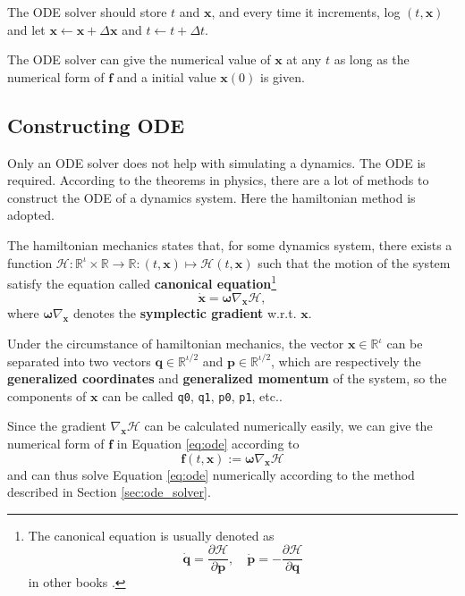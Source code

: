 \documentclass[12pt]{article}
\begin{document}
The ODE solver should store $t$ and $\mathbf x$,
and every time it increments, log $\left(t,\mathbf x\right)$ and
let $\mathbf x\leftarrow\mathbf x+\Delta\mathbf x$ and $t\leftarrow t+\Delta t$.

The ODE solver can give the numerical value of $\mathbf x$ at any $t$
as long as the numerical form of $\mathbf f$
and a initial value $\mathbf x\left(0\right)$
is given.

\subsection{Constructing ODE}

Only an ODE solver does not help with simulating a dynamics.
The ODE is required.
According to the theorems in physics,
there are a lot of methods to construct the ODE of a dynamics system.
Here the hamiltonian method is adopted.

The hamiltonian mechanics states that, for some dynamics system,
there exists a function
$\mathcal H:\mathbb R^\iota\times\mathbb R\rightarrow\mathbb R:\left(t,\mathbf x\right)\mapsto\mathcal H\left(t,\mathbf x\right)$
such that the motion of the system satisfy the equation
called \textbf{canonical equation}\footnote{
  The canonical equation is usually denoted as
  \begin{equation*}
    \dot{\mathbf q}=\frac{\partial\mathcal H}{\partial\mathbf p},
    \quad
    \dot{\mathbf p}=-\frac{\partial\mathcal H}{\partial\mathbf q}
  \end{equation*}
  in other books \cite{hand2008mechanics}\cite[p. 65]{arnold1989mathmech}\cite[p. 132]{landau1976mechanics}.
}
\begin{equation}
  \dot{\mathbf x}=\boldsymbol\omega\nabla_{\mathbf x}\mathcal H,
\end{equation}
where $\boldsymbol\omega\nabla_{\mathbf x}$ denotes the \textbf{symplectic gradient} w.r.t. $\mathbf x$.

Under the circumstance of hamiltonian mechanics,
the vector $\mathbf x\in\mathbb R^\iota$ can be separated into two vectors
$\mathbf q\in\mathbb R^{\iota/2}$ and $\mathbf p\in\mathbb R^{\iota/2}$,
which are respectively the \textbf{generalized coordinates} and \textbf{generalized momentum} of the system,
so the components of $\mathbf x$ can be called \texttt{q0}, \texttt{q1}, \texttt{p0}, \texttt{p1}, etc..

Since the gradient $\nabla_{\mathbf x}\mathcal H$ can be calculated numerically easily,
we can give the numerical form of $\mathbf f$ in Equation \ref{eq:ode} according to
\begin{equation}
  \mathbf f\left(t,\mathbf x\right):=\boldsymbol\omega\nabla_{\mathbf x}\mathcal H
\end{equation}
and can thus solve Equation \ref{eq:ode} numerically according to the method described in Section \ref{sec:ode_solver}.
\end{document}
